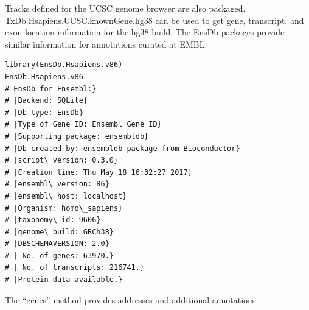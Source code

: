 Tracks defined for the UCSC genome browser are also
packaged. TxDb.Hsapiens.UCSC.knownGene.hg38 can be
used to get gene, transcript, and exon location information
for the hg38 build. The EnsDb packages provide similar
information for annotations curated at EMBL.


\begin{shaded}
\begin{verbatim}
library(EnsDb.Hsapiens.v86)
EnsDb.Hsapiens.v86
# EnsDb for Ensembl:}
# |Backend: SQLite}
# |Db type: EnsDb}
# |Type of Gene ID: Ensembl Gene ID}
# |Supporting package: ensembldb}
# |Db created by: ensembldb package from Bioconductor}
# |script\_version: 0.3.0}
# |Creation time: Thu May 18 16:32:27 2017}
# |ensembl\_version: 86}
# |ensembl\_host: localhost}
# |Organism: homo\_sapiens}
# |taxonomy\_id: 9606}
# |genome\_build: GRCh38}
# |DBSCHEMAVERSION: 2.0}
# | No. of genes: 63970.}
# | No. of transcripts: 216741.}
# |Protein data available.}
\end{verbatim}
\end{shaded}


The ``genes'' method provides addresses and additional
annotations.

